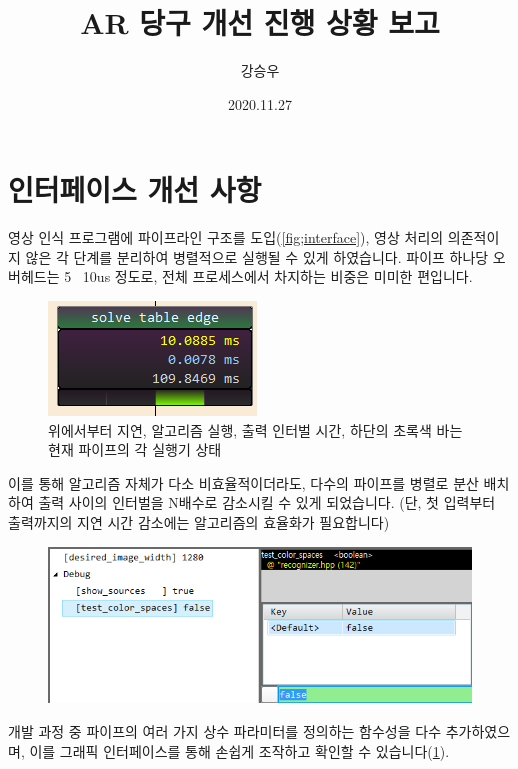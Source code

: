 \documentclass[10pt]{oblivoir}
\title{AR 당구 개선 진행 상황 보고}
\author{강승우}
\date{2020.11.27}
\begin{document}
\maketitle

\section{인터페이스 개선 사항}
영상 인식 프로그램에 파이프라인 구조를 도입(\cref{fig;interface}), 영상 처리의 의존적이지 않은 각 단계를 분리하여 병렬적으로 실행될 수 있게 하였습니다. 파이프 하나당 오버헤드는 5~ 10us 정도로, 전체 프로세스에서 차지하는 비중은 미미한 편입니다.

\begin{figure}[ht]
    \centering
    \includegraphics{img/pipe.png}
    \caption{위에서부터 지연, 알고리즘 실행, 출력 인터벌 시간, 하단의 초록색 바는 현재 파이프의 각 실행기 상태}
\end{figure}

이를 통해 알고리즘 자체가 다소 비효율적이더라도, 다수의 파이프를 병렬로 분산 배치하여 출력 사이의 인터벌을 N배수로 감소시킬 수 있게 되었습니다. (단, 첫 입력부터 출력까지의 지연 시간 감소에는 알고리즘의 효율화가 필요합니다)

\begin{figure}[ht]
    \centering
    \includegraphics{img/options.png}
    \caption{}
    \label{fig;option-view}
\end{figure}
    
개발 과정 중 파이프의 여러 가지 상수 파라미터를 정의하는 함수성을 다수 추가하였으며, 이를 그래픽 인터페이스를 통해 손쉽게 조작하고 확인할 수 있습니다(\cref{fig;option-view}).
\end{document}
